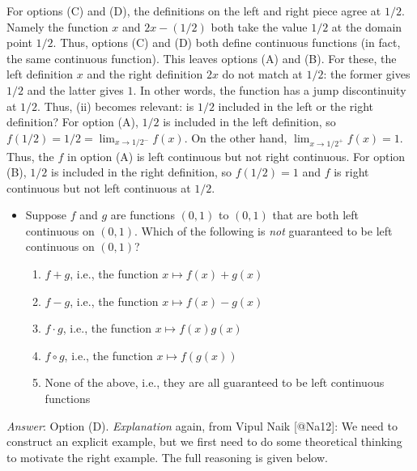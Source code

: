For options (C) and (D), the definitions on the left and right piece
agree at \(1/2\). Namely the function \(x\) and \(2x - (1/2)\) both take
the value \(1/2\) at the domain point \(1/2\). Thus, options (C) and (D)
both define continuous functions (in fact, the same continuous
function). This leaves options (A) and (B). For these, the left
definition \(x\) and the right definition \(2x\) do not match at
\(1/2\): the former gives \(1/2\) and the latter gives \(1\). In other
words, the function has a jump discontinuity at \(1/2\). Thus, (ii)
becomes relevant: is \(1/2\) included in the left or the right
definition? For option (A), \(1/2\) is included in the left definition,
so \(f(1/2) = 1/2 = \lim_{x \to 1/2^-} f(x)\). On the other hand,
\(\lim_{x \to 1/2^+} f(x) = 1\). Thus, the \(f\) in option (A) is left
continuous but not right continuous. For option (B), \(1/2\) is included
in the right definition, so \(f(1/2) = 1\) and \(f\) is right continuous
but not left continuous at \(1/2\).

\begin{itemize}
\item
  Suppose \(f\) and \(g\) are functions \((0,1)\) to \((0,1)\) that are
  both left continuous on \((0,1)\). Which of the following is
  \emph{not} guaranteed to be left continuous on \((0,1)\)?

  \begin{enumerate}
  \def\labelenumi{(\Alph{enumi})}
  \tightlist
  \item
    \(f + g\), i.e., the function \(x \mapsto f(x) + g(x)\)
  \item
    \(f - g\), i.e., the function \(x \mapsto f(x) - g(x)\)
  \item
    \(f \cdot g\), i.e., the function \(x \mapsto f(x)g(x)\)
  \item
    \(f \circ g\), i.e., the function \(x \mapsto f(g(x))\)
  \item
    None of the above, i.e., they are all guaranteed to be left
    continuous functions
  \end{enumerate}
\end{itemize}

\emph{Answer}: Option (D). \emph{Explanation} again, from Vipul Naik
{[}@Na12{]}: We need to construct an explicit example, but we first need
to do some theoretical thinking to motivate the right example. The full
reasoning is given below.

